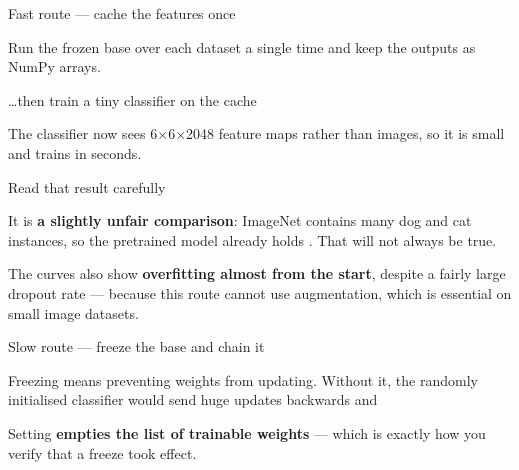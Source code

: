 \documentclass[aspectratio=169,11pt,t]{beamer}
\begin{document}
\begin{frame}[shrink=25]{Fast route --- cache the features once}
{\fontsize{9.4}{12.6}\selectfont\color{fg2}Run the frozen base over each dataset a single time and keep the outputs as NumPy arrays.\par}\vskip 4pt
\end{frame}

\begin{frame}[shrink=25]{\ldots{}then train a tiny classifier on the cache}
{\fontsize{9.4}{12.6}\selectfont\color{fg2}The classifier now sees 6$\times$6$\times$2048 feature maps rather than images, so it is small and trains in seconds.\par}\vskip 4pt
\end{frame}

\begin{frame}{Read that result carefully}
\begin{iband}[amber]
It is \textbf{a slightly unfair comparison}: ImageNet contains many dog and cat instances, so the pretrained model already holds . That will not always be true.
\end{iband}
{\fontsize{9.4}{12.6}\selectfont\color{fg2}The curves also show \textbf{overfitting almost from the start}, despite a fairly large dropout rate --- because this route cannot use augmentation, which is essential on small image datasets.\par}\vskip 4pt
\end{frame}

\begin{frame}[shrink=25]{Slow route --- freeze the base and chain it}
{\fontsize{9.4}{12.6}\selectfont\color{fg2}Freezing means preventing weights from updating. Without it, the randomly initialised classifier would send huge updates backwards and \par}\vskip 4pt
{\fontsize{9.4}{12.6}\selectfont\color{fg2}Setting  \textbf{empties the list of trainable weights} --- which is exactly how you verify that a freeze took effect.\par}\vskip 4pt
\end{frame}
\end{document}
